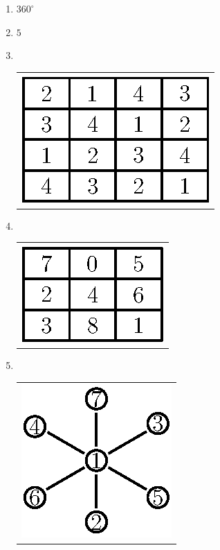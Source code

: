 \begin{enumerate}
\item $360^{\circ}$

\item $5$

  \smallskip
  
\item 
~

  \vskip -0.5cm
  
\begin{tabular}[t]{c}
\centering
\includegraphics{src/figures/ans17.eps}
\end{tabular}

\newpage

\item 
~

  \vskip -0.5cm
  
\begin{tabular}[t]{c}
\centering
\includegraphics{src/figures/ans18.eps}
\end{tabular}

\medskip

\item 
~

  \vskip -0.5cm
  
\begin{tabular}[t]{c}
\centering
\includegraphics{src/figures/ans19.eps}
\end{tabular}


\end{enumerate}

